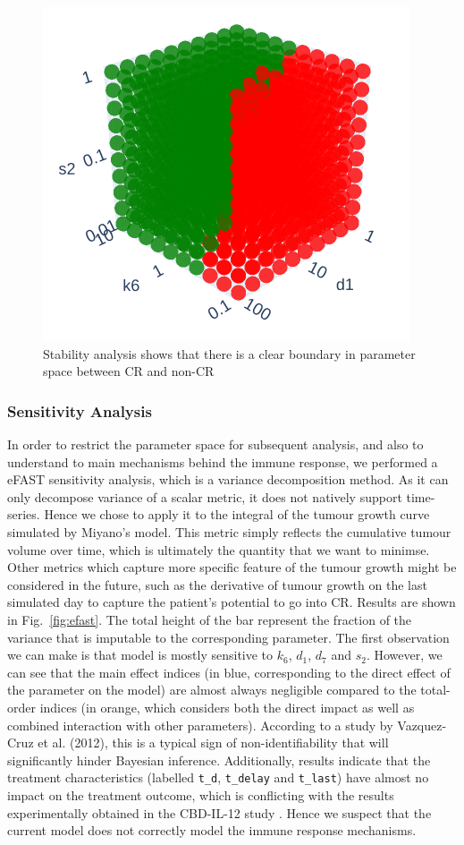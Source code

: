 \documentclass[11pt]{article}
\begin{document}
\begin{figure}[!ht]
    \centering\includegraphics[scale=0.5]{stability.png}
    \caption{Stability analysis shows that there is a clear boundary in parameter space between CR and non-CR}
    \label{fig:mcsa}
\end{figure}

\subsubsection{Sensitivity Analysis}
In order to restrict the parameter space for subsequent analysis, and also to understand to main mechanisms behind the immune response, we performed a eFAST sensitivity analysis, which is a variance decomposition method. As it can only decompose variance of a scalar metric, it does not natively support time-series. Hence we chose to apply it to the integral of the tumour growth curve simulated by Miyano's model. This metric simply reflects the cumulative tumour volume over time, which is ultimately the quantity that we want to minimse. Other metrics which capture more specific feature of the tumour growth might be considered in the future, such as the derivative of tumour growth on the last simulated day to capture the patient's potential to go into CR. Results are shown in Fig.~\ref{fig:efast}. The total height of the bar represent the fraction of the variance that is imputable to the corresponding parameter. The first observation we can make is that model is mostly sensitive to $k_6$, $d_1$, $d_7$ and $s_2$. However, we can see that the main effect indices (in blue, corresponding to the direct effect of the parameter on the model) are almost always negligible compared to the total-order indices (in orange, which considers both the direct impact as well as combined interaction with other parameters). According to a study by Vazquez-Cruz et al. (2012), this is a typical sign of non-identifiability \cite{tomgro} that will significantly hinder Bayesian inference. Additionally, results indicate that the treatment characteristics (labelled \verb+t_d+, \verb+t_delay+ and \verb+t_last+) have almost no impact on the treatment outcome, which is conflicting with the results experimentally obtained in the CBD-IL-12 study \cite{cbdil12}. Hence we suspect that the current model does not correctly model the immune response mechanisms. 
\end{document}
